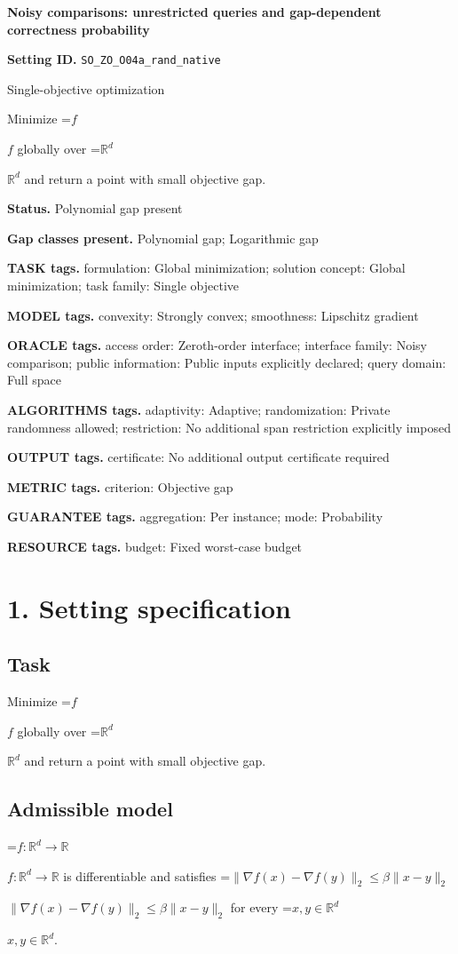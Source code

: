 \documentclass[10pt,a4paper]{article}
\newcommand{\AtlasMath}[1]{\par\begingroup\centering\setbox0=\hbox{$\displaystyle #1$}\ifdim\wd0>1.4\linewidth\typeout{ATLAS WIDE FORMULA: \the\wd0}\fi\ifdim\wd0>\linewidth\resizebox{\linewidth}{!}{\box0}\else\box0\fi\par\endgroup}
\newcommand{\AtlasInlineMath}[1]{\begingroup\setbox0=\hbox{$#1$}\ifdim\wd0>.4\linewidth\endgroup\AtlasMath{#1}\else\endgroup$#1$\fi}
\begin{document}
\raggedright

{\LARGE\bfseries\sffamily\color{AtlasNavy} Noisy comparisons: unrestricted queries and gap-dependent correctness probability\par}\vspace{5pt}
\textbf{Setting ID.} \texttt{SO\_\allowbreak{}ZO\_\allowbreak{}O04a\_\allowbreak{}rand\_\allowbreak{}native}

Single-objective optimization

Minimize \AtlasInlineMath{f} globally over \AtlasInlineMath{\mathbb{R}^d} and return a point with small objective gap.

\textbf{Status.} Polynomial gap present

\textbf{Gap classes present.} Polynomial gap; Logarithmic gap

\textbf{TASK tags.} formulation: Global minimization; solution concept: Global minimization; task family: Single objective

\textbf{MODEL tags.} convexity: Strongly convex; smoothness: Lipschitz gradient

\textbf{ORACLE tags.} access order: Zeroth-order interface; interface family: Noisy comparison; public information: Public inputs explicitly declared; query domain: Full space

\textbf{ALGORITHMS tags.} adaptivity: Adaptive; randomization: Private randomness allowed; restriction: No additional span restriction explicitly imposed

\textbf{OUTPUT tags.} certificate: No additional output certificate required

\textbf{METRIC tags.} criterion: Objective gap

\textbf{GUARANTEE tags.} aggregation: Per instance; mode: Probability

\textbf{RESOURCE tags.} budget: Fixed worst-case budget

\section{1. Setting specification}
\subsection{Task}
Minimize \AtlasInlineMath{f} globally over \AtlasInlineMath{\mathbb{R}^d} and return a point with small objective gap.

\subsection{Admissible model}
\AtlasInlineMath{f:\mathbb{R}^d\to\mathbb{R}} is differentiable and satisfies \AtlasInlineMath{\|\nabla f(x)-\nabla f(y)\|_2\le\beta\|x-y\|_2} for every \AtlasInlineMath{x,y\in\mathbb{R}^d}.
\end{document}
